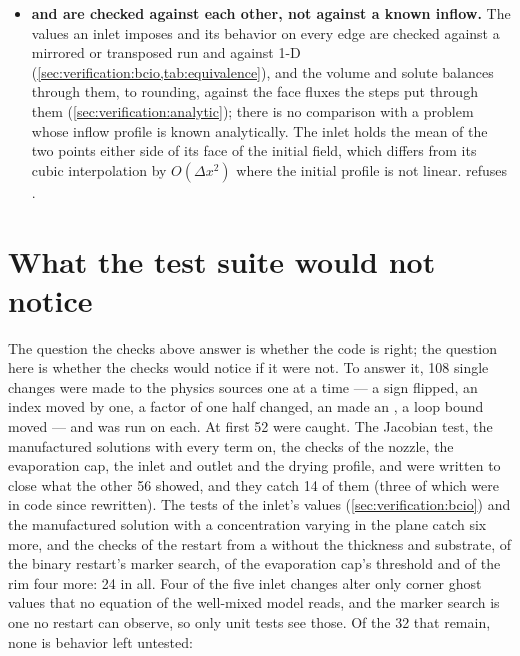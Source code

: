 \begin{itemize}
    agree to $10^{-7}$ of its scale (\cref{sec:verification:backends}); the
    AMGCL job of the continuous integration runs it on every commit. Every
    other check sets  or resolves  to it, so the
    accuracy claims of this manual rest on , and
     inherits them through that comparison. The claim of
    \cref{sec:verification:linalg} --- that bit-identity across thread counts
    is \emph{asserted by a test} --- is about  alone, and
     can never join it: it is not bit-reproducible by
    construction.
  \item \textbf{ and  are checked against
    each other, not against a known inflow.} The values an inlet imposes and
    its behavior on every edge are checked against a mirrored or transposed
    run and against 1-D (\cref{sec:verification:bcio,tab:equivalence}), and
    the volume and solute balances through them, to rounding, against the
    face fluxes the steps put through them (\cref{sec:verification:analytic});
    there is no comparison with a
    problem whose inflow profile is known analytically. The inlet holds the
    mean of the two points either side of its face of the initial field,
    which differs from its cubic interpolation by $O(\Delta x^2)$ where the
    initial profile is not linear.  refuses .
\end{itemize}

\section{What the test suite would not notice}
\label{sec:notverified:mutation}

The question the checks above answer is whether the code is right; the
question here is whether the checks would notice if it were not. To answer it,
108 single changes were made to the physics sources one at a time --- a sign
flipped, an index moved by one, a factor of one half changed, an \code{+=}
made an \code{=}, a loop bound moved --- and  was run on each. At
first 52 were caught. The Jacobian test, the manufactured solutions with
every term on, the checks of the nozzle, the evaporation cap, the inlet and
outlet and the drying profile, and  were written to
close what the other 56 showed, and they catch 14 of them (three of which
were in code since rewritten). The tests of the inlet's values
(\cref{sec:verification:bcio}) and the  manufactured solution with a
concentration varying in the plane catch six more, and the checks of the
restart from a  without the thickness and substrate, of the binary restart's marker search, of the
evaporation cap's threshold and of the  rim four more: 24 in all.
Four of the five inlet changes alter only corner ghost values that no equation
of the well-mixed model reads, and the marker search is one no restart can
observe, so only unit tests see those. Of the 32 that remain, none is
behavior left untested:

